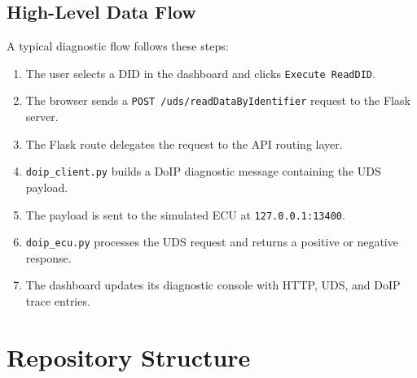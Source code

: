 \documentclass[a4paper,10pt,titlepage,oneside]{article}
\begin{document}
\subsection{High-Level Data Flow}

A typical diagnostic flow follows these steps:

\begin{enumerate}[leftmargin=*]
    \item The user selects a DID in the dashboard and clicks \texttt{Execute ReadDID}.
    \item The browser sends a \texttt{POST /uds/readDataByIdentifier} request to the Flask server.
    \item The Flask route delegates the request to the API routing layer.
    \item \texttt{doip\_client.py} builds a DoIP diagnostic message containing the UDS payload.
    \item The payload is sent to the simulated ECU at \texttt{127.0.0.1:13400}.
    \item \texttt{doip\_ecu.py} processes the UDS request and returns a positive or negative response.
    \item The dashboard updates its diagnostic console with HTTP, UDS, and DoIP trace entries.
\end{enumerate}

\section{Repository Structure}
\end{document}
